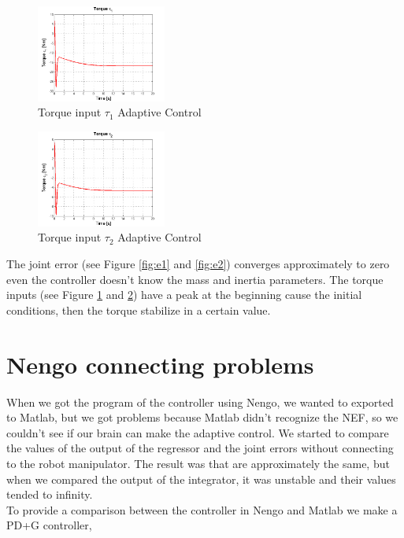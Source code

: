 \begin{figure}[h]
\centering
\includegraphics[width=0.38\textwidth]{imagenes/6-neuronal/T1.png}
 \caption{Torque input $\tau_1$ Adaptive Control}
 \label{fig:T1}
\end{figure}

\begin{figure}[h]
\centering
\includegraphics[width=0.38\textwidth]{imagenes/6-neuronal/T2.png}
 \caption{Torque input $\tau_2$ Adaptive Control}
 \label{fig:T2}
\end{figure}

The joint error (see Figure \ref{fig:e1} and \ref{fig:e2}) converges approximately to zero even the controller doesn't know the mass and inertia parameters. The torque inputs (see Figure \ref{fig:T1} and \ref{fig:T2}) have a  peak at the beginning cause the initial conditions, then the torque stabilize in a certain value.

\section{Nengo connecting problems}
When we got the program of the controller using Nengo, we wanted to exported to Matlab, but we got problems because Matlab didn't recognize the NEF, so we couldn't see if our brain can make the adaptive control. We started to compare the values  of the output of the regressor and the joint errors without connecting to the robot manipulator. The result was that are approximately the same, but when we compared the output of the integrator, it was unstable and their values tended to infinity.\\

To provide a comparison between the controller in Nengo and Matlab we make a PD+G controller,

